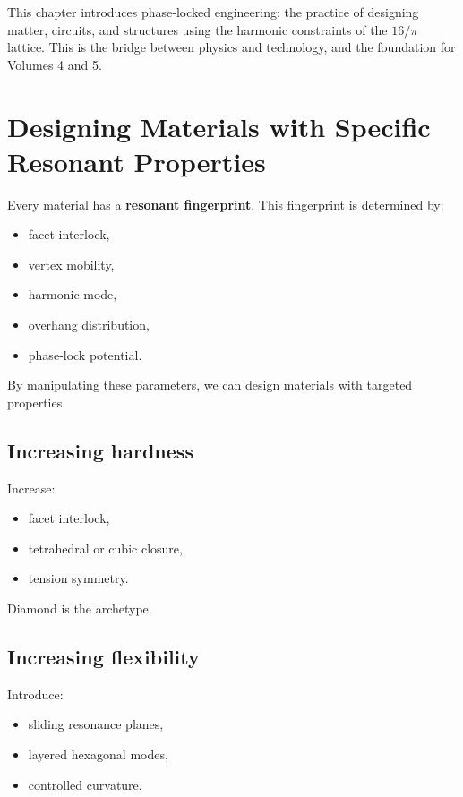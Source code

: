 \documentclass[11pt, letterpaper, openany]{book}
\begin{document}
This chapter introduces phase‑locked engineering: the practice of designing matter,
circuits, and structures using the harmonic constraints of the $16/\pi$ lattice. This is the
bridge between physics and technology, and the foundation for Volumes 4 and 5.

\section{Designing Materials with Specific Resonant Properties}

Every material has a \textbf{resonant fingerprint}. This fingerprint is determined by:

\begin{itemize}
    \item facet interlock,
    \item vertex mobility,
    \item harmonic mode,
    \item overhang distribution,
    \item phase‑lock potential.
\end{itemize}

By manipulating these parameters, we can design materials with targeted properties.

\subsection*{Increasing hardness}

Increase:

\begin{itemize}
    \item facet interlock,
    \item tetrahedral or cubic closure,
    \item tension symmetry.
\end{itemize}

Diamond is the archetype.

\subsection*{Increasing flexibility}

Introduce:

\begin{itemize}
    \item sliding resonance planes,
    \item layered hexagonal modes,
    \item controlled curvature.
\end{itemize}
\end{document}
